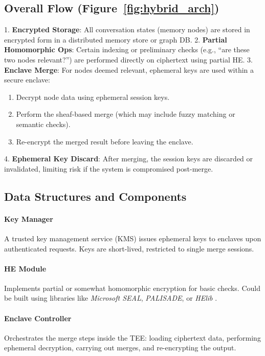 \documentclass{article}
\begin{document}
\subsection{Overall Flow (Figure~\ref{fig:hybrid_arch})}
1. \textbf{Encrypted Storage}: All conversation states (memory nodes) are stored in encrypted form in a distributed memory store or graph DB.  
2. \textbf{Partial Homomorphic Ops}: Certain indexing or preliminary checks (e.g., “are these two nodes relevant?”) are performed directly on ciphertext using partial HE.  
3. \textbf{Enclave Merge}: For nodes deemed relevant, ephemeral keys are used within a secure enclave:
   \begin{enumerate}
       \item Decrypt node data using ephemeral session keys.
       \item Perform the sheaf-based merge (which may include fuzzy matching or semantic checks).
       \item Re-encrypt the merged result before leaving the enclave.
   \end{enumerate}
4. \textbf{Ephemeral Key Discard}: After merging, the session keys are discarded or invalidated, limiting risk if the system is compromised post-merge.

\subsection{Data Structures and Components}

\paragraph{Key Manager}
A trusted key management service (KMS) issues ephemeral keys to enclaves upon authenticated requests. Keys are short-lived, restricted to single merge sessions.

\paragraph{HE Module}
Implements partial or somewhat homomorphic encryption for basic checks. Could be built using libraries like \emph{Microsoft SEAL}, \emph{PALISADE}, or \emph{HElib} \citep{halevi2014alg}.

\paragraph{Enclave Controller}
Orchestrates the merge steps inside the TEE: loading ciphertext data, performing ephemeral decryption, carrying out merges, and re-encrypting the output.
\end{document}
